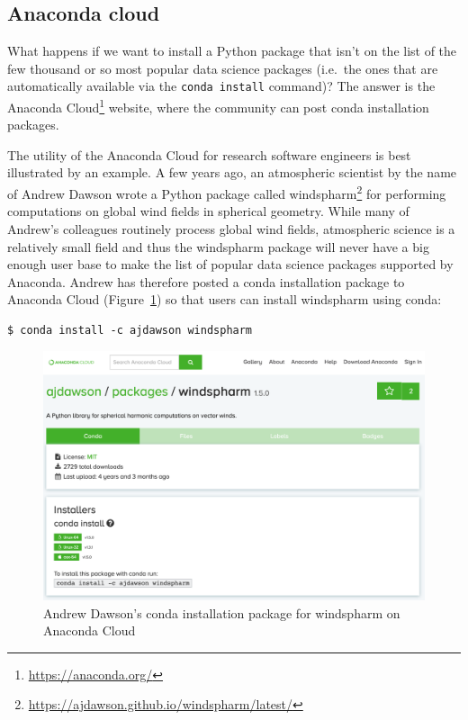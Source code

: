 \documentclass[
]{krantz}
\renewcommand{\href}[2]{#2\footnote{\url{#1}}}
\begin{document}
\hypertarget{anaconda-cloud}{%
\subsection{Anaconda cloud}\label{anaconda-cloud}}

What happens if we want to install a Python package
that isn't on the list of the few thousand or so most popular data science packages
(i.e.~the ones that are automatically available via the \texttt{conda\ install} command)?
The answer is the \href{https://anaconda.org/}{Anaconda Cloud} website,
where the community can post conda installation packages.

The utility of the Anaconda Cloud for research software engineers
is best illustrated by an example.
A few years ago, an atmospheric scientist by the name of Andrew Dawson
wrote a Python package called \href{https://ajdawson.github.io/windspharm/latest/}{windspharm}
for performing computations on global wind fields in spherical geometry.
While many of Andrew's colleagues routinely process global wind fields,
atmospheric science is a relatively small field and thus the windspharm package
will never have a big enough user base to make the list of
popular data science packages supported by Anaconda.
Andrew has therefore posted a conda installation package to Anaconda Cloud
(Figure~\ref{fig:anaconda-windspharm-ajdawson})
so that users can install windspharm using conda:

\begin{verbatim}
$ conda install -c ajdawson windspharm
\end{verbatim}

\begin{figure}

{\centering \includegraphics[width=1\linewidth]{figures/anaconda/cloud-windspharm-ajdawson} 

}

\caption{Andrew Dawson's conda installation package for windspharm on Anaconda Cloud}\label{fig:anaconda-windspharm-ajdawson}
\end{figure}
\end{document}
